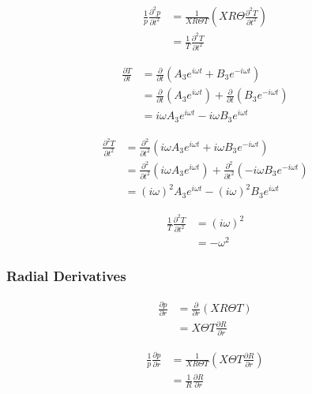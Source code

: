 \begin{align*}
    \frac{1}{p}\frac{\partial^2 p}{\partial t^2} 
    &=
    \frac{ 1}{X R \Theta T}  \left( XR\Theta\frac{\partial^2 T}{\partial t^2} \right) \\
    &=\frac{ 1}{ T}\frac{\partial^2 T}{\partial t^2}  
\end{align*}

\begin{align*}
    \frac{\partial T}{\partial t} &=
    \frac{\partial}{\partial t}
        \left( 
        A_3 e^{i \omega t} + B_3 e^{-i \omega t}
    \right)  \\
    &=
    \frac{\partial}{\partial t} \left(A_3 e^{i \omega t}  \right) +
    \frac{\partial}{\partial t} \left(B_3 e^{-i \omega t}  \right)\\ 
    &= i \omega A_3 e^{i \omega t} - i \omega B_3 e^{i \omega t} 
\end{align*}

\begin{align*}
    \frac{\partial^2 T}{\partial t^2} &=
    \frac{\partial^2}{\partial t^2}
        \left( 
        i \omega A_3 e^{i \omega t} + i \omega B_3 e^{-i \omega t}
    \right)  \\
    &=
    \frac{\partial^2}{\partial t^2} \left(i \omega A_3 e^{i \omega t}  \right) +
    \frac{\partial^2}{\partial t^2} \left(- i \omega B_3 e^{-i \omega t}  \right)\\ 
    &= (i \omega)^2 A_3 e^{i \omega t} - (i \omega)^2 B_3 e^{i \omega t} 
\end{align*}

\begin{align*}
    \frac{1}{T}\frac{\partial^2 T}{\partial t^2} 
    &=
    (i\omega)^2 \\
    &= -\omega^2
\end{align*}


\subsubsection{Radial Derivatives}
\begin{align*}
    \frac{\partial p}{\partial r} 
    &=
    \frac{\partial }{\partial r}  \left( XR\Theta T \right) \\
    &=
    X\Theta T\frac{\partial R}{\partial r}  
\end{align*}


\begin{align*}
    \frac{1}{p}\frac{\partial p}{\partial r} 
    &=
    \frac{ 1}{X R \Theta T}  \left( X\Theta T\frac{\partial R}{\partial r} \right) \\
    &=\frac{ 1}{ R}\frac{\partial R}{\partial r}  
\end{align*}


